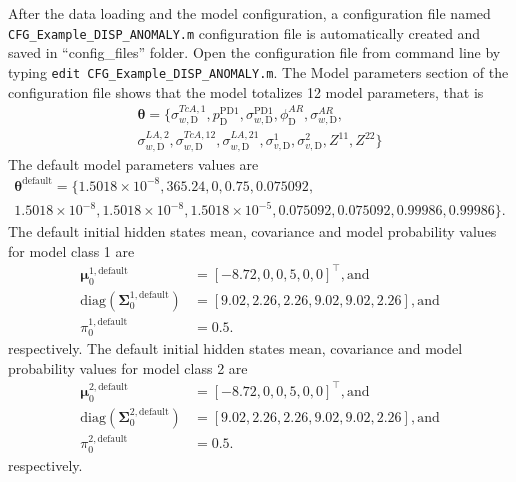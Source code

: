 After the data loading and the model configuration, a configuration file named \lstinline[basicstyle = \mlttfamily \small, backgroundcolor = \color{light-gray}]!CFG_Example_DISP_ANOMALY.m! configuration file is automatically created and saved in ``config\_files'' folder.
Open the configuration file from \MATLAB{} command line by typing  \colorbox{light-gray}{\lstinline[basicstyle = \mlttfamily \small, backgroundcolor = \color{light-gray}]!edit CFG_Example_DISP_ANOMALY.m!}.
The Model parameters section of the configuration file shows that the model totalizes 12 model parameters, that is 
\begin{gather*}
\bm\theta=\{\sigma_{w, \text{D}}^{TcA,1}, p^{\text{PD1}}_{\text{D}}, \sigma_{w,\text{D}}^{\text{PD1}}, \phi^{AR}_{\text{D}}, \sigma_{w,\text{D}}^{AR}, \\
 \sigma_{w, \text{D}}^{LA,2}, \sigma_{w, \text{D}}^{TcA, 12}, \sigma_{w, \text{D}}^{LA, 21}, \sigma^{1}_{v,\text{D}}, \sigma^{2}_{v,\text{D}}, Z^{11},   Z^{22}\} 
 \end{gather*}
The default model parameters values are 
\begin{gather*}
\bm\theta^{\text{default}}=\{1.5018\times10^{-8}, 365.24, 0, 0.75, 0.075092, \\
1.5018\times10^{-8}, 1.5018\times10^{-8}, 1.5018\times10^{-5}, 0.075092, 0.075092, 0.99986, 0.99986\}.
\end{gather*}
The default initial hidden states mean, covariance  and model probability values for model class 1 are 
\begin{align*}
 \bm \mu^{1,\text{default}}_{0} & = [	-8.72 ,	0    , 	0     ,	5   ,  	0    , 	0       ]^{\intercal}, \text{and} \\
 \text{diag}(\bm\Sigma^{1,\text{default}}_{0})  & = [	9.02  ,	2.26  	, 2.26  ,	9.02  	, 9.02  ,	2.26     ], \text{and} \\
 \pi_{0}^{1,\text{default}} & = 0.5.
\end{align*}
respectively.
The default initial hidden states mean, covariance  and model probability values for model class 2 are 
\begin{align*}
 \bm \mu^{2,\text{default}}_{0} & = [	-8.72 	, 0    , 	0  ,   	5   ,  	0   ,  	0       ]^{\intercal}, \text{and} \\
 \text{diag}(\bm\Sigma^{2,\text{default}}_{0})  & = [	9.02  ,	2.26  	, 2.26  ,	9.02  	, 9.02  ,	2.26    ], \text{and} \\
 \pi_{0}^{2,\text{default}} & = 0.5.
\end{align*}
respectively.



